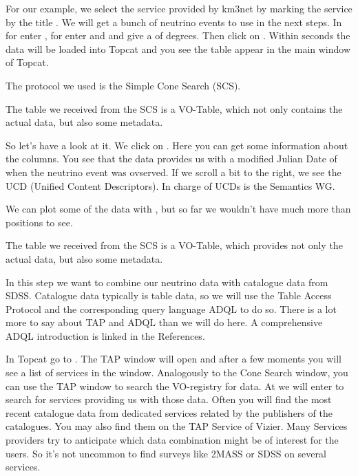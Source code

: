 \documentclass[twoside]{article}[12pt]
\begin{document}
For our example, we select the service provided by km3net by marking the
service by the title . We will get a bunch of
neutrino events to use in the next steps.  In 
for  enter , for  enter  and and give
a  of  degrees. Then click on . Within
seconds the data will be loaded into Topcat and you see the table appear
in the main window of Topcat.

The protocol we used is the Simple Cone Search (SCS).


\SCS

The table we received from the SCS is a VO-Table, which not
only contains the actual data, but also some metadata.

\VOTABLE

So let's have a look at
it. We click on \goto {}. Here you can get some
information about the columns. You see that the data provides us with a
modified Julian Date of when the neutrino event was ovserved. If we
scroll a bit to the right, we see the UCD (Unified Content Descriptors).
In charge of UCDs is the Semantics WG. 

\UCD

We can
plot some of the data with , but so far we wouldn't have
much more than positions to see. 

The table we received from the SCS is a VO-Table, which provides not
only the actual data, but also some metadata. 


In this step we want to combine our neutrino data with catalogue data
from SDSS. Catalogue data typically is table data, so we will use the
Table Access Protocol and the corresponding query language ADQL to do
so. There is a lot more to say about TAP and ADQL than we will do here.
A comprehensive ADQL introduction is linked in the References. 

In Topcat go to  \goto{}. The TAP window will open and
after a few moments you will see a list of services in the window.
Analogously to the Cone Search window, you can use the TAP window to
search the VO-registry for data. At  we will enter
 to search for services providing us with those data. Often
you will find the most recent catalogue data from dedicated services
related by the publishers of the catalogues. You may also find them on
the TAP Service of Vizier. Many Services providers try to anticipate
which data combination might be of interest for the users. So it's not
uncommon to find surveys like 2MASS or SDSS on several services. 
\TAPSTD
 
\end{document}
